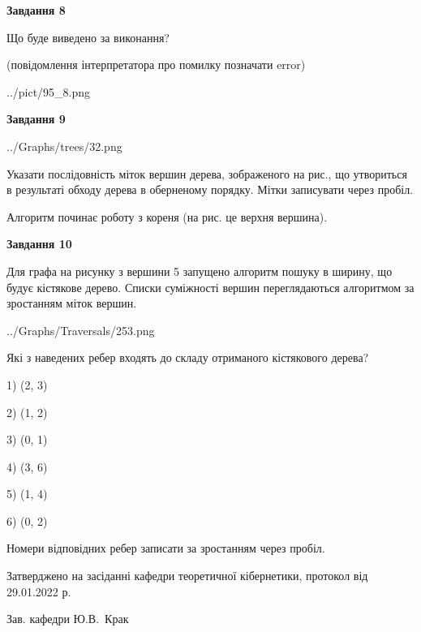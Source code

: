 \documentclass[12pt, ukrainian]{article}
\begin{document}
{\begin {large}
{\begin {center}\textbf{Завдання 8}\end {center}}\par
Що буде виведено за виконання?\par
 (повідомлення інтерпретатора про помилку позначати error)\par
\begin{center}
	{../pict/95_8.png}
\end{center}
\newpage

{\begin {center}\textbf{Завдання 9}\end {center}}\par

\begin{center}
	{../Graphs/trees/32.png}
\end{center}
Указати послідовність міток вершин дерева, зображеного на рис., що утвориться в результаті обходу дерева в оберненому порядку. Мітки записувати через пробіл.\par Алгоритм починає роботу з кореня (на рис. це верхня вершина).\par
\newpage

{\begin {center}\textbf{Завдання 10}\end {center}}\par
Для графа на рисунку з вершини 5 запущено алгоритм пошуку в ширину, що будує кістякове дерево. Списки суміжності вершин переглядаються алгоритмом за зростанням міток вершин.\par
\begin{center}
	{../Graphs/Traversals/253.png}
\end{center}
\par Які з наведених ребер входять до складу отриманого кістякового дерева?\par
1) (2, 3)\par
2) (1, 2)\par
3) (0, 1)\par
4) (3, 6)\par
5) (1, 4)\par
6) (0, 2)\par
{\vskip 15pt} Номери відповідних ребер записати за зростанням через пробіл.\par
\newpage


\end {large}
}
{\smallskip \begin {small} Затверджено на засіданні кафедри теоретичної кібернетики, протокол  від   29.01.2022 р.\par\smallskip\smallskip
{\parbox {6.5 cm}{Зав. кафедри \dotfill Ю.В.~Крак}} \end{small}}
\end{document}
